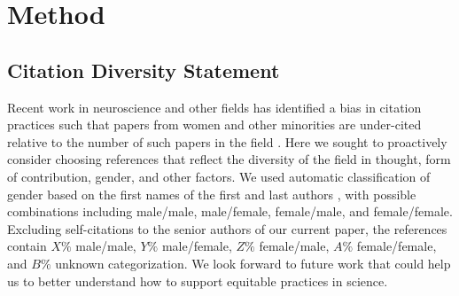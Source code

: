 \documentclass[12pt]{article}
\begin{document}
\section{Method}
\subsection{Citation Diversity Statement}

Recent work in neuroscience and other fields has identified a bias in citation practices such that papers from women and other minorities are under-cited relative to the number of such papers in the field \cite{Dworkin2020.01.03.894378, maliniak2013gender, caplar2017quantitative, chakravartty2018communicationsowhite, YannikThiemKrisF.SealeyAmyE.FerrerAdrielM.Trott2018, dion2018gendered}. Here we sought to proactively consider choosing references that reflect the diversity of the field in thought, form of contribution, gender, and other factors. We used automatic classification of gender based on the first names of the first and last authors \cite{Dworkin2020.01.03.894378}, with possible combinations including male/male, male/female, female/male, and female/female. Excluding self-citations to the senior authors of our current paper, the references contain $X\%$ male/male, $Y\%$ male/female, $Z\%$ female/male, $A\%$ female/female, and $B\%$ unknown categorization. We look forward to future work that could help us to better understand how to support equitable practices in science.

\newpage


\end{document}
